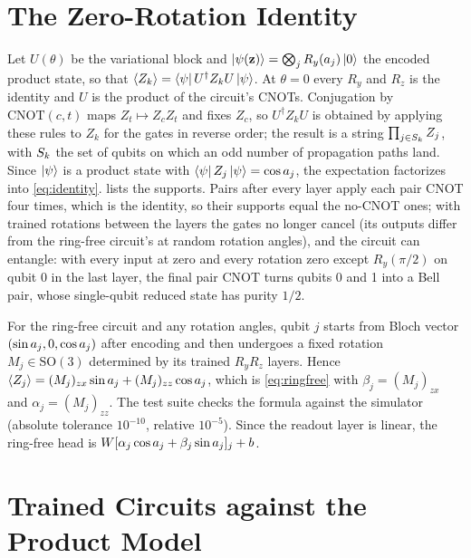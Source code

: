\section{The Zero-Rotation Identity}
\label{app:identity}

Let $U(\theta)$ be the variational block and $\ket{\psi(\mathbf{z})}=\bigotimes_j R_y(a_{j})\ket{0}$
the encoded product state, so that $\langle Z_{k}\rangle=\bra{\psi}U^\dagger Z_k U\ket{\psi}$. At
$\theta=0$ every $R_y$ and $R_z$ is the identity and $U$ is the product of the circuit's
CNOTs. Conjugation by $\mathrm{CNOT}(c,t)$ maps $Z_t\mapsto Z_cZ_t$ and fixes $Z_c$, so
$U^\dagger Z_k U$ is obtained by applying these rules to $Z_k$ for the gates in reverse
order; the result is a string $\prod_{j\in S_k}Z_j$, with $S_k$ the set of qubits on which an
odd number of propagation paths land. Since $\ket{\psi}$ is a product state with
$\bra{\psi}Z_j\ket{\psi}=\cos a_{j}$, the expectation factorizes into
\cref{eq:identity}.  lists the supports. Pairs after every layer apply
each pair CNOT four times, which is the identity, so their supports equal the no-CNOT ones;
with trained rotations between the layers the gates no longer cancel (its outputs differ
from the ring-free circuit's at random rotation angles), and the circuit can entangle: with
every input at zero and every rotation zero except $R_y(\pi/2)$ on qubit 0 in the last layer,
the final pair CNOT turns qubits 0 and 1 into a Bell pair, whose single-qubit reduced state
has purity $1/2$.

For the ring-free circuit and any rotation angles, qubit $j$ starts from Bloch vector
$(\sin a_{j},0,\cos a_{j})$ after encoding and then undergoes a fixed rotation $M_j\in
\mathrm{SO}(3)$ determined by its trained $R_yR_z$ layers. Hence
$\langle Z_{j}\rangle=(M_j)_{zx}\sin a_{j}+(M_j)_{zz}\cos a_{j}$, which is \cref{eq:ringfree} with
$\beta_j=(M_j)_{zx}$ and $\alpha_j=(M_j)_{zz}$. The test suite checks the formula against the simulator (absolute tolerance
$10^{-10}$, relative $10^{-5}$). Since the readout layer is linear, the ring-free head is
$W[\alpha_j\cos a_{j}+\beta_j\sin a_{j}]_j+b$.



\section{Trained Circuits against the Product Model}
\label{app:zeroangle}

